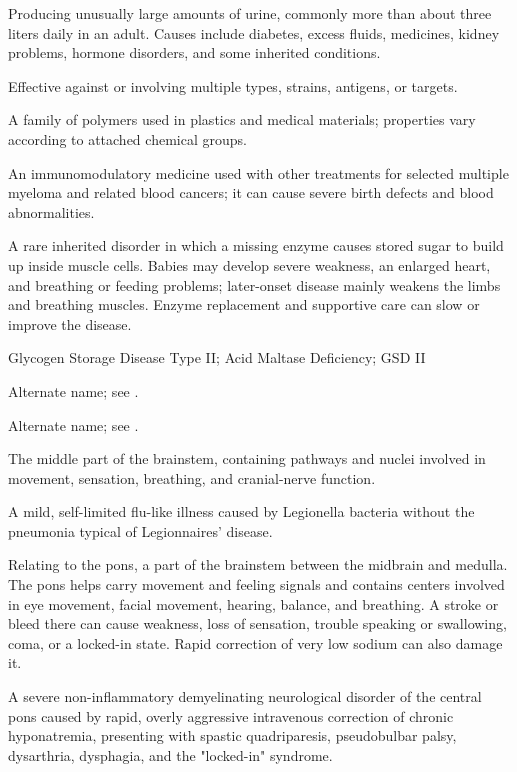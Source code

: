  Producing unusually large amounts of urine, commonly more than about three liters daily in an adult. Causes include diabetes, excess fluids, medicines, kidney problems, hormone disorders, and some inherited conditions.

 Effective against or involving multiple types, strains, antigens, or targets.

 A family of polymers used in plastics and medical materials; properties vary according to attached chemical groups.

 An immunomodulatory medicine used with other treatments for selected multiple myeloma and related blood cancers; it can cause severe birth defects and blood abnormalities.

 A rare inherited disorder in which a missing enzyme causes stored sugar to build up inside muscle cells. Babies may develop severe weakness, an enlarged heart, and breathing or feeding problems; later-onset disease mainly weakens the limbs and breathing muscles. Enzyme replacement and supportive care can slow or improve the disease.

\synonyms
Glycogen Storage Disease Type II; Acid Maltase Deficiency; GSD II

 Alternate name; see .

 Alternate name; see .

 The middle part of the brainstem, containing pathways and nuclei involved in movement, sensation, breathing, and cranial-nerve function.

 A mild, self-limited flu-like illness caused by Legionella bacteria without the pneumonia typical of Legionnaires’ disease.

 Relating to the pons, a part of the brainstem between the midbrain and medulla. The pons helps carry movement and feeling signals and contains centers involved in eye movement, facial movement, hearing, balance, and breathing. A stroke or bleed there can cause weakness, loss of sensation, trouble speaking or swallowing, coma, or a locked-in state. Rapid correction of very low sodium can also damage it.

 A severe non-inflammatory demyelinating neurological disorder of the central pons caused by rapid, overly aggressive intravenous correction of chronic hyponatremia, presenting with spastic quadriparesis, pseudobulbar palsy, dysarthria, dysphagia, and the "locked-in" syndrome.

